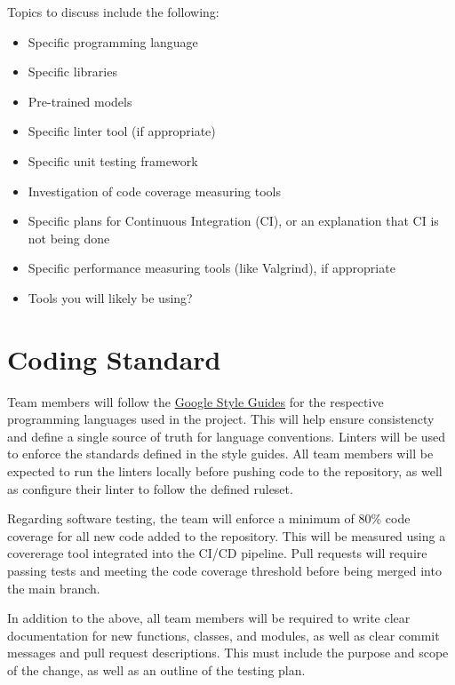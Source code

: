 \documentclass{article}
\begin{document}
Topics to discuss include the following:

\begin{itemize}
\item Specific programming language
\item Specific libraries
\item Pre-trained models
\item Specific linter tool (if appropriate)
\item Specific unit testing framework
\item Investigation of code coverage measuring tools
\item Specific plans for Continuous Integration (CI), or an explanation that CI
  is not being done
\item Specific performance measuring tools (like Valgrind), if
  appropriate
\item Tools you will likely be using?
\end{itemize}


\section{Coding Standard}


Team members will follow the \href{https://github.com/google/styleguide}{Google Style Guides} for the respective programming languages used in the project. This will help ensure consistencty and define a single source of truth for language conventions. 
Linters will be used to enforce the standards defined in the style guides. All team members will be expected to run the linters locally before pushing code to the repository, as well as configure their linter to follow the defined ruleset. 

Regarding software testing, the team will enforce a minimum of 80\% code coverage for all new code added to the repository. This will be measured using a covererage tool integrated into the CI/CD pipeline. Pull requests will require passing tests and meeting the code coverage threshold before being merged into the main branch.

In addition to the above, all team members will be required to write clear documentation for new functions, classes, and modules, as well as clear commit messages and pull request descriptions. This must include the purpose and scope of the change, as well as an outline of the testing plan. 
\end{document}
